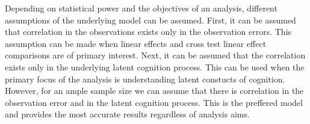\documentclass[
]{article}
\begin{document}
Depending on statistical power and the objectives of an analysis, different assumptions of the underlying model can be assumed. First, it can be assumed that correlation in the observations exists only in the observation errors. This assumption can be made when linear effects and cross test linear effect comparisons are of primary interest. Next, it can be assumed that the correlation exists only in the underlying latent cognition process. This can be used when the primary focus of the analysis is understanding latent constucts of cognition. However, for an ample sample size we can assume that there is correlation in the observation error and in the latent cognition process. This is the preffered model and provides the most accurate results regardless of analysis aims.
\end{document}
